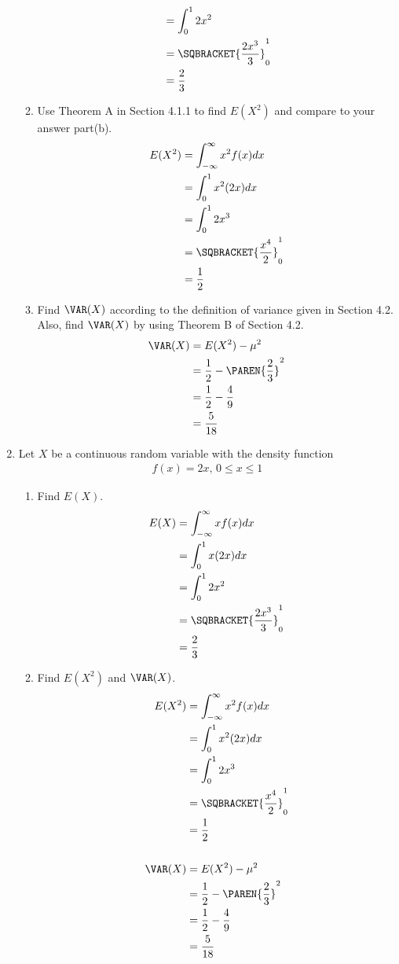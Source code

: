 \documentclass[10pt,a4paper]{report}
\newcommand{\BLUE}[1]{\textcolor{blue}{#1}}
\begin{document}
\begin{enumerate}
\begin{enumerate}
{\begin{align*}
			&=  \int_{0}^1  2x^2 \\
			&= \SQBRACKET{\frac{2x^3}{3}}_{0}^1 \\
			&= \frac{2}{3}
		\end{align*} }
		\setcounter{enumi}{2}
		\item Use Theorem A in Section 4.1.1 to find $E(X^2)$ and compare to your answer part(b).
		\BLUE{\begin{align*}
			E(X^2) &= \int_{-\infty}^\infty  x^2f(x)dx \\
			&=  \int_{0}^1  x^2(2x)dx \\
			&=  \int_{0}^1  2x^3 \\
			&= \SQBRACKET{\frac{x^4}{2}}_{0}^1 \\
			&= \frac{1}{2}
		\end{align*}
		}
		\item Find $\VAR(X)$ according to the definition of variance given in Section 4.2.  Also, find $\VAR(X)$ by using Theorem B of Section 4.2.
		\BLUE{\begin{align*}
			\VAR(X) &= E(X^2) - \mu^2 \\
			&= \frac{1}{2} - \PAREN{\frac{2}{3}}^2 \\
			&= \frac{1}{2} - \frac{4}{9}\\
			&= \frac{5}{18}
		\end{align*}
		}
	\end{enumerate}
	\setcounter{enumi}{13}
	\item Let $X$ be a continuous random variable with the density function
	\begin{align*}
		f(x)=2x, \, 0\le x \le 1
	\end{align*}
	\begin{enumerate}
		\item Find $E(X)$.
		\BLUE{\begin{align*}
			E(X) &= \int_{-\infty}^\infty  xf(x)dx \\
			&=  \int_{0}^1  x(2x)dx \\
			&=  \int_{0}^1  2x^2 \\
			&= \SQBRACKET{\frac{2x^3}{3}}_{0}^1 \\
			&= \frac{2}{3}
		\end{align*} 
		}
		\item Find $E(X^2)$ and $\VAR(X)$.
		\BLUE{\begin{align*}
			E(X^2) &= \int_{-\infty}^\infty  x^2f(x)dx \\
			&=  \int_{0}^1  x^2(2x)dx \\
			&=  \int_{0}^1  2x^3 \\
			&= \SQBRACKET{\frac{x^4}{2}}_{0}^1 \\
			&= \frac{1}{2}\\
			\\
			\VAR(X) &= E(X^2) - \mu^2 \\
			&= \frac{1}{2} - \PAREN{\frac{2}{3}}^2 \\
			&= \frac{1}{2} - \frac{4}{9}\\
			&= \frac{5}{18}
			\end{align*}
		}
	\end{enumerate}
\end{enumerate}
\end{document}
